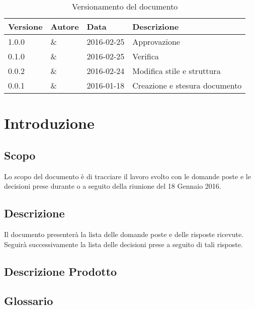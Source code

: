 \documentclass[12pt,a4paper]{article}
\newcommand{\dataCreazione}{18 Gennaio 2016}
\begin{document}
\begin{table}[H]
	\begin{center}
		\begin{tabular}{p{} p{} p{} p{}}
			\toprule
			\textbf{Versione} & \textbf{Autore} & \textbf{Data} & \textbf{Descrizione}\\
			\midrule
	        \midrule
	        1.0.0 & \IB{} \& \AVI{} & 2016-02-25 & Approvazione \\
	        \midrule
	        0.1.0 & \NDC{} \& \AVI{} & 2016-02-25 & Verifica \\
	        \midrule
	        0.0.2 & \TP{} \& \AVI{} & 2016-02-24 & Modifica stile e struttura \\
            \midrule
			0.0.1 & \AVI{} \& \AVI{} & 2016-01-18 & Creazione e stesura documento \\
			\bottomrule
		\end{tabular}
		\caption{Versionamento del documento}
		\label{tabVers1}
	\end{center}
\end{table}
\newpage

\tableofcontents
\listoftables
\newpage

\section{Introduzione}

\subsection{Scopo}
Lo scopo del documento è di tracciare il lavoro svolto con le domande poste e le decisioni prese durante o a seguito della riunione del \dataCreazione.

\subsection{Descrizione}
Il documento presenterà la lista delle domande poste e delle risposte ricevute. Seguirà successivamente la lista delle decisioni prese a seguito di tali risposte.

\subsection{Descrizione Prodotto}
\descrizioneProdotto

\subsection{Glossario}
\glossarioPrint
\end{document}
